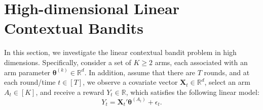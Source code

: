 \documentclass[aos,preprint]{imsart}
\theoremstyle{plain}
\theoremstyle{definition}
\newcommand{\btheta}{\boldsymbol{\theta}}
\newcommand{\bX}{\boldsymbol{X}}
\newcommand{\bR}{\mathbb{R}}
\begin{document}

\section{High-dimensional Linear Contextual Bandits} \label{sec: problem formulation}
In this section, we investigate the linear contextual bandit problem in high dimensions. Specifically, consider a set of $K \geq 2$ arms, each associated with an arm parameter $\btheta^{(k)} \in \mathbb{R}^d$. In addition, assume that there are $T$ rounds, and at each round/time $t \in [T]$, we observe a covariate vector $\bX_t \in \mathbb{R}^d$, select an arm $A_t \in [K]$, and receive a reward $Y_t \in \bR$, which satisfies the following linear model:
\begin{equation*} 
    Y_t = \bX_t' \btheta^{(A_t)} + \epsilon_t.
\end{equation*}
\end{document}
